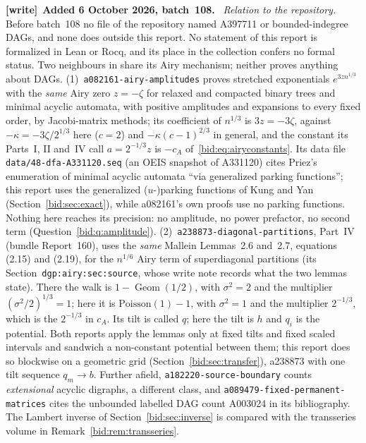 \documentclass[11pt,letterpaper]{article}
\numberwithin{equation}{section}
\theoremstyle{remark}\newtheorem{remark}[theorem]{Remark}
\newcommand{\file}[1]{\nolinkurl{#1}}
\newenvironment{writenote}[1][]{\par\smallskip\begingroup\small
 \noindent\textbf{[write]}\if\relax\detokenize{#1}\relax\else~\textbf{#1.}\fi\ }%
 {\par\endgroup\smallskip}
\begin{document}
\begin{writenote}[Added 6 October 2026, batch~108]
\emph{Relation to the repository.} Before batch~108 no file of the repository
named A397711 or bounded-indegree DAGs, and none does outside this report. No
statement of this report is formalized in Lean or Rocq, and its place in the
collection confers no formal status. Two neighbours in
share its Airy mechanism; neither proves anything about DAGs.
(1)~\file{a082161-airy-amplitudes} proves stretched exponentials
$e^{3zn^{1/3}}$ with the \emph{same} Airy zero $z=-\zeta$ for relaxed and
compacted binary trees and minimal acyclic automata, with positive amplitudes
and expansions to every fixed order, by Jacobi-matrix methods; its
coefficient of $n^{1/3}$ is $3z=-3\zeta$, against $-\kappa=-3\zeta/2^{1/3}$
here ($c=2$) and $-\kappa(c-1)^{2/3}$ in general, and the constant its
Parts~I, II and~IV call $a=2^{-1/3}z$ is $-c_A$ of~\eqref{bid:eq:airyconstants}.
Its data file \file{data/48-dfa-A331120.seq} (an OEIS snapshot of A331120)
cites Priez's enumeration of minimal acyclic automata ``via generalized
parking functions''; this report uses the generalized ($u$-)parking functions
of Kung and Yan (Section~\ref{bid:sec:exact}), while a082161's own proofs use
no parking functions. Nothing here reaches its precision: no amplitude, no
power prefactor, no second term (Question~\ref{bid:q:amplitude}).
(2)~\file{a238873-diagonal-partitions}, Part~IV (bundle Report~160), uses the
\emph{same} Mallein Lemmas~2.6 and~2.7, equations (2.15) and (2.19), for the
$n^{1/6}$ Airy term of superdiagonal partitions (its
Section~\file{dgp:airy:sec:source}, whose write note records what the two
lemmas state). There the walk is $1-\operatorname{Geom}(1/2)$, with
$\sigma^2=2$ and the multiplier $(\sigma^2/2)^{1/3}=1$; here it is
$\mathrm{Poisson}(1)-1$, with $\sigma^2=1$ and the multiplier $2^{-1/3}$, which
is the $2^{-1/3}$ in $c_A$. Its tilt is called $q$; here the tilt is $h$ and
$q_i$ is the potential. Both reports apply the lemmas only at fixed tilts
and fixed scaled intervals and sandwich a non-constant potential between
them; this report does so blockwise on a geometric grid
(Section~\ref{bid:sec:transfer}), a238873 with one tilt sequence $q_m\to b$.
Further afield, \file{a182220-source-boundary} counts \emph{extensional}
acyclic digraphs, a different class, and \file{a089479-fixed-permanent-matrices}
cites the unbounded labelled DAG count A003024 in its bibliography. The
Lambert inverse of Section~\ref{bid:sec:inverse} is compared with the
transseries volume in Remark~\ref{bid:rem:transseries}.
\end{writenote}
\end{document}

